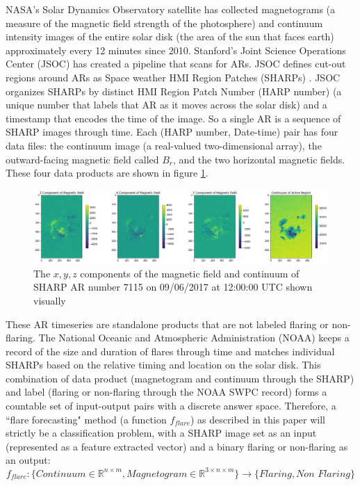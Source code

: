 \documentclass[defaultstyle,11pt]{thesis}
\begin{document}
NASA's Solar Dynamics Observatory satellite has collected magnetograms (a measure of the magnetic field strength of the photosphere) and continuum intensity images of the entire solar disk (the area of the sun that faces earth) approximately every 12 minutes since 2010. Stanford's Joint Science Operations Center (JSOC) has created a pipeline that scans for ARs. JSOC defines cut-out regions around ARs as Space weather HMI Region Patches (SHARPs) \cite{SHARP_Pipeline}. JSOC organizes SHARPs by distinct HMI Region Patch Number (HARP number) (a unique number that labels that AR as it moves across the solar disk) and a timestamp that encodes the time of the image. So a single AR is a sequence of SHARP images through time. Each (HARP number, Date-time) pair has four data files: the continuum image (a real-valued two-dimensional array), the outward-facing magnetic field called $B_r$, and the two horizontal magnetic fields. These four data products are shown in figure \ref{activeregionall}.
\begin{figure}[h]
\centering
\includegraphics[width=\linewidth]{ThesisFilePkg/figures/data/activeregionFull.png}
\caption{The $x, y, z$ components of the magnetic field and continuum of SHARP AR number 7115 on 09/06/2017 at 12:00:00 UTC shown visually}
\label{activeregionall}
\end{figure}

These AR timeseries are standalone products that are not labeled flaring or non-flaring. The National Oceanic and Atmospheric Administration (NOAA) keeps a record of the size and duration of flares through time and matches individual SHARPs based on the relative timing and location on the solar disk. This combination of data product (magnetogram and continuum through the SHARP) and label (flaring or non-flaring through the NOAA SWPC record) forms a countable set of input-output pairs with a discrete answer space. Therefore, a ``flare forecasting" method (a function $f_{flare}$) as described in this paper will strictly be a classification problem, with a SHARP image set as an input (represented as a feature extracted vector) and a binary flaring or non-flaring as an output:
$$f_{flare} : \{\textit{Continuum} \in \mathbb{R}^{n\times m}, \textit{Magnetogram} \in \mathbb{R}^{3\times n \times m}\} \rightarrow \{\textit{Flaring}, \textit{Non Flaring}\}$$
\end{document}
